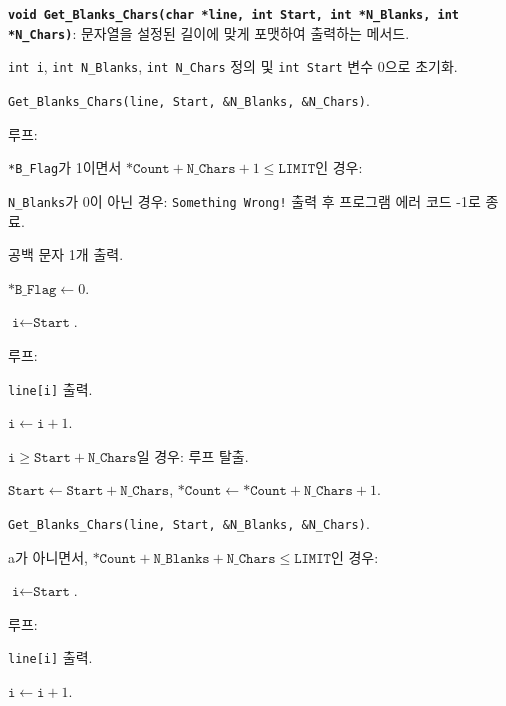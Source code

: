 \documentclass[runningheads]{../../../llncs}
\begin{document}
\textbf{\texttt{void Get_Blanks_Chars(char *line, int Start, int *N_Blanks, int *N_Chars)}}: 문자열을 설정된 길이에 맞게 포맷하여 출력하는 메서드.
\begin{algorithm}
	\item \texttt{int i}, \texttt{int N_Blanks}, \texttt{int N_Chars} 정의 및 \texttt{int Start} 변수 0으로 초기화.
	\item \texttt{Get_Blanks_Chars(line, Start, \&N_Blanks, \&N_Chars)}.
	\item 루프:
			\begin{algorithm}
				\item \texttt{*B_Flag}가 1이면서 $\texttt{*Count} + \texttt{N_Chars} + 1 \leq \texttt{LIMIT}$인 경우:
					\begin{algorithm}
						\item \texttt{N_Blanks}가 0이 아닌 경우: \texttt{Something Wrong!} 출력 후 프로그램 에러 코드 -1로 종료.
						\item 공백 문자 1개 출력.
						\item $\texttt{*B_Flag} \leftarrow 0$.
						\item $\texttt{i} \leftarrow \texttt{Start}$.
						\item 루프:
							\begin{algorithm}
								\item \texttt{line[i]} 출력.
								\item $\texttt{i} \leftarrow \texttt{i} + 1$.
								\item $\texttt{i} \geq \texttt{Start} + \texttt{N_Chars}$일 경우: 루프 탈출.
							\end{algorithm}
						\item $\texttt{Start} \leftarrow \texttt{Start} + \texttt{N_Chars}$, $\texttt{*Count} \leftarrow \texttt{*Count} + \texttt{N_Chars} + 1$.
						\item \texttt{Get_Blanks_Chars(line, Start, \&N_Blanks, \&N_Chars)}.
 					\end{algorithm}
 				\item a가 아니면서, $\texttt{*Count} + \texttt{N_Blanks} + \texttt{N_Chars} \leq \texttt{LIMIT}$인 경우:
 					\begin{algorithm}
						\item $\texttt{i} \leftarrow \texttt{Start}$.
						\item 루프:
							\begin{algorithm}
								\item \texttt{line[i]} 출력.
								\item $\texttt{i} \leftarrow \texttt{i} + 1$.

\end{algorithm}
\end{algorithm}
\end{algorithm}
\end{algorithm}
\end{document}
